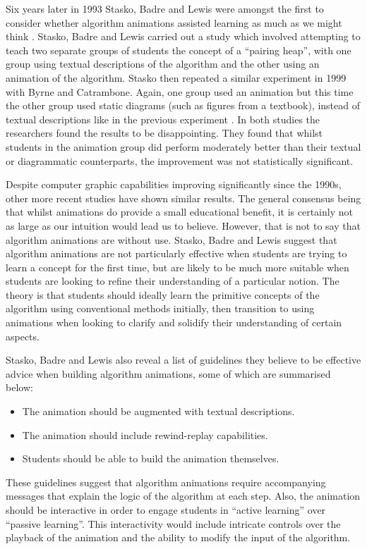 \documentclass{l4proj}
\begin{document}
Six years later in 1993 Stasko, Badre and Lewis were amongst the first to consider whether algorithm animations assisted learning as much as we might think \cite{StaskoBadreLewis}. Stasko, Badre and Lewis carried out a study which involved attempting to teach two separate groups of students the concept of a ``pairing heap'', with one group using textual descriptions of the algorithm and the other using an animation of the algorithm. Stasko then repeated a similar experiment in 1999 with Byrne and Catrambone. Again, one group used an animation but this time the other group used static diagrams (such as figures from a textbook), instead of textual descriptions like in the previous experiment \cite{StaskoByrneCatrambone}. In both studies the researchers found the results to be disappointing. They found that whilst students in the animation group did perform moderately better than their textual or diagrammatic counterparts, the improvement was not statistically significant.

Despite computer graphic capabilities improving significantly since the 1990s, other more recent studies have shown similar results. The general consensus being that whilst animations do provide a small educational benefit, it is certainly not as large as our intuition would lead us to believe. However, that is not to say that algorithm animations are without use. Stasko, Badre and Lewis suggest that algorithm animations are not particularly effective when students are trying to learn a concept for the first time, but are likely to be much more suitable when students are looking to refine their understanding of a particular notion. The theory is that students should ideally learn the primitive concepts of the algorithm using conventional methods initially, then transition to using animations when looking to clarify and solidify their understanding of certain aspects.

Stasko, Badre and Lewis also reveal a list of guidelines they believe to be effective advice when building algorithm animations, some of which are summarised below:
\begin{itemize}
\item The animation should be augmented with textual descriptions.
\item The animation should include rewind-replay capabilities.
\item Students should be able to build the animation themselves.
\end{itemize}
These guidelines suggest that algorithm animations require accompanying messages that explain the logic of the algorithm at each step. Also, the animation should be interactive in order to engage students in ``active learning'' over ``passive learning''. This interactivity would include intricate controls over the playback of the animation and the ability to modify the input of the algorithm.
\end{document}

